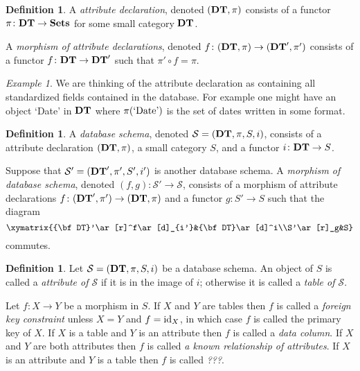 \documentclass{amsart}
\def\tn{\textnormal}
\def\mc{\mathcal}
\def\to{\rightarrow}
\def\taking{\colon}
\def\id{\tn{id}}
\def\Sets{{\bf Sets}}
\def\mcS{\mc{S}}
\theoremstyle{remark}
\newtheorem{example}[theorem]{Example}
\theoremstyle{definition}
\newtheorem{definition}[theorem]{Definition}
\def\DT{{\bf DT}}
\begin{document}
\begin{definition}

A {\em attribute declaration}, denoted $(\DT,\pi)$ consists of a functor $\pi\taking\DT\to\Sets$ for some small category $\DT$.

A {\em morphism of attribute declarations}, denoted $f\taking(\DT,\pi)\to(\DT',\pi')$ consists of a functor $f\taking\DT\to\DT'$ such that $\pi'\circ f=\pi$.

\end{definition}

\begin{example}

We are thinking of the attribute declaration as containing all standardized fields contained in the database.  For example one might have an object `Date' in $\DT$ where $\pi(\tn{`Date'})$ is the set of dates written in some format.

\end{example}

\begin{definition}

A {\em database schema}, denoted $\mcS=(\DT,\pi,S,i)$, consists of a attribute declaration $(\DT,\pi)$, a small category $S$, and a functor $i\taking\DT\to S$.  

Suppose that $\mcS'=(\DT',\pi',S',i')$ is another database schema.  A {\em morphism of database schema}, denoted $(f,g)\taking\mcS'\to\mcS$, consists of a morphism of attribute declarations $f\taking(\DT',\pi')\to(\DT,\pi)$ and a functor $g\taking S'\to S$ such that the diagram $$\xymatrix{\DT'\ar[r]^f\ar[d]_{i'}&\DT\ar[d]^i\\S'\ar[r]_g&S}$$ commutes.

\end{definition}

\begin{definition}

Let $\mcS=(\DT,\pi,S,i)$ be a database schema.  An object of $S$ is called a {\em attribute of $\mcS$} if it is in the image of $i$; otherwise it is called a {\em table of $\mcS$}.  

Let $f\taking X\to Y$ be a morphism in $S$.  If $X$ and $Y$ are tables then $f$ is called a {\em foreign key constraint} unless $X=Y$ and $f=\id_X$, in which case $f$ is called the primary key of $X$.  If $X$ is a table and $Y$ is an attribute then $f$ is called a {\em data column}.  If $X$ and $Y$ are both attributes then $f$ is called {\em a known relationship of attributes}.  If $X$ is an attribute and $Y$ is a table then $f$ is called {\em ???}.

\end{definition}
\end{document}

